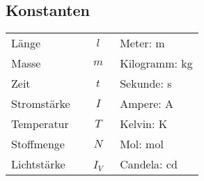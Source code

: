 \subsection{Konstanten}
\settowidth{\MyLenA}{Temperatur~~}
\begin{tabular}{lcl}
	Länge 		& $l$ & Meter: \si{\metre} \\
	Masse 		& $m$ & Kilogramm: \si{\kilogram}\\
	Zeit		& $t$ & Sekunde: \si{\second}\\
	Stromstärke 	& $I$ & Ampere: \si{\ampere}\\
	Temperatur	& $T$ & Kelvin: \si{\kelvin}\\
	Stoffmenge	& $N$ & Mol: \si{\mol}\\
	Lichtstärke~~	& ~$I_V$~ & Candela: \si{\candela}\\
\end{tabular}

